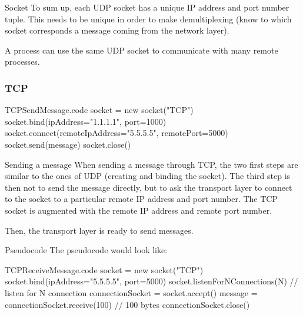 \documentclass[a4paper]{article}
\begin{document}
\begin{parag}{Socket}
    To sum up, each UDP socket has a unique IP address and port number tuple. This needs to be unique in order to make demultiplexing (know to which socket corresponds a message coming from the network layer).

    A process can use the same UDP socket to communicate with many remote processes.
\end{parag}

\subsubsection{TCP}
\begin{filecontents*}[overwrite]{TCPSendMessage.code}
socket = new socket("TCP")
socket.bind(ipAddress="1.1.1.1", port=1000)
socket.connect(remoteIpAddress="5.5.5.5", remotePort=5000)
socket.send(message)
socket.close()
\end{filecontents*}

\begin{parag}{Sending a message}
    When sending a message through TCP, the two first steps are similar to the ones of UDP (creating and binding the socket). The third step is then not to send the message directly, but to ask the transport layer to connect to the socket to a particular remote IP address and port number. The TCP socket is augmented with the remote IP address and remote port number. 

    Then, the transport layer is ready to send messages.

    \begin{subparag}{Pseudocode}
        The pseudocode would look like:
    \end{subparag}
\end{parag}

\begin{filecontents*}[overwrite]{TCPReceiveMessage.code}
socket = new socket("TCP")
socket.bind(ipAddress="5.5.5.5", port=5000)
socket.listenForNConnections(N)  // listen for N connection
connectionSocket = socket.accept()
message = connectionSocket.receive(100)  // 100 bytes
connectionSocket.close()
\end{filecontents*}
\end{document}
